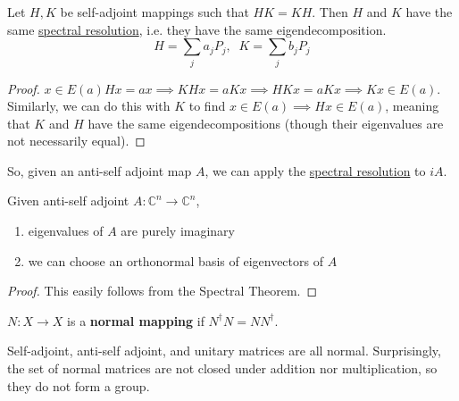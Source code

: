 	\begin{theorem}
	  \label{thm:spectral-resolution-of-commuting-self-adjoint}
    Let $H, K$ be self-adjoint mappings such that $H K = K H$. Then $H$ and $K$ have the same \hyperref[def:spectral-resolution]{spectral resolution}, i.e. they have the same eigendecomposition. 
    \begin{equation}
      H = \sum_j a_j P_j, \; \; K = \sum_j b_j P_j
    \end{equation}
  \end{theorem}
  \begin{proof}
    $x \in E(a) H x = a x \implies K H x = a K x \implies H K x = a K x \implies K x \in E(a)$. Similarly, we can do this with $K$ to find $x \in E(a) \implies H x \in E(a)$, meaning that $K$ and $H$ have the same eigendecompositions (though their eigenvalues are not necessarily equal). 
  \end{proof}

	So, given an anti-self adjoint map $A$, we can apply the \hyperref[def:spectral-resolution]{spectral resolution} to $iA$. 

	\begin{theorem}
	  \label{thm:spectral-resolution-of-anti-self-adjoint}
    Given anti-self adjoint $A: \mathbb{C}^n \to \mathbb{C}^n$, 
    \begin{enumerate}
      \item eigenvalues of $A$ are purely imaginary
      \item we can choose an orthonormal basis of eigenvectors of $A$
    \end{enumerate}
  \end{theorem}
  \begin{proof}
    This easily follows from the Spectral Theorem. 
  \end{proof}

  \begin{definition}
    \label{def:normal-maps}
    $N: X \to X$ is a \textbf{normal mapping} if $N^\dagger N = N N^\dagger$. 
  \end{definition}

	Self-adjoint, anti-self adjoint, and unitary matrices are all normal. Surprisingly, the set of normal matrices are not closed under addition nor multiplication, so they do not form a group. 

